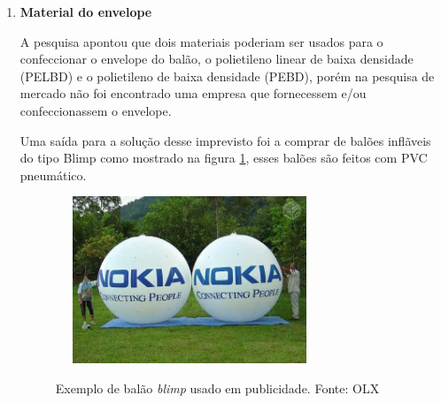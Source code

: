 \begin{enumerate}
		Como o balão tem um volume de 113,1 $m^3$ serão necessários aproximadamente 12 cilindros para inflar o balão.

		Optamos pela distribuidora Praxair como fornecedora de gás hélio em decorrência do menor preço e confiabilidade. Como teremos um total de 5 balões será necessário um valor de R\$ 79.800,00.

		A empresa Park e Ação faz a recarga de cilindros vazios. O preço para recarregar 2$m^3$ de hélio é de R\$ 200,00.

		Considerando o preço do volume de gás hélio como R\$ 100,00 o metro cúbico e arredondado o valor da reposição para 40$m^3$ de gás por balão será necessário repor 200$m^3$ por R\$100,00 o metro cúbico de gás ao final de 4 meses. O que nos dá um valor de R\$ 20.000,00 a cada 4 meses. Desta forma, o gás do balão terá um custo médio mensal de R\$5.000,00.

		\begin{itemize}
			\item Custo inicial do gás: R\$  79.800,00
			\item Custo mensal do gás:  R\$5.000,00.
		\end{itemize}

		Estes valores foram obtidos atraves de pesquisa e seleção de fornecedor, escolhendo as empresas \cite{precoGasHelio} e \cite{oxigmed}.

		\hspace{1cm}

	\item  \textbf{Material do envelope}

		A pesquisa apontou que dois materiais poderiam ser usados para o confeccionar o envelope do balão, o polietileno linear de baixa densidade (PELBD) e o polietileno de baixa densidade (PEBD), porém na pesquisa de mercado não foi encontrado uma empresa que fornecessem e/ou confeccionassem o envelope.

		Uma saída para a solução desse imprevisto foi a comprar de balões inflãveis do tipo Blimp como mostrado na figura \ref{img:blimp2}, esses balões são feitos com PVC pneumático.

		\begin{figure}[htp]
			\centering
			\caption{Exemplo de balão \textit{blimp} usado em publicidade. Fonte: OLX}
			\includegraphics[width=8cm, height=5cm]{figuras/blimp}
			\label{img:blimp2}
		\end{figure}


\end{enumerate}
